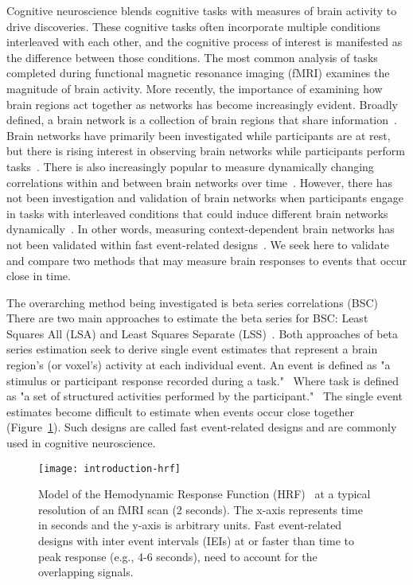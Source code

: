 \documentclass[phd,appendix,figures]{uithesis}
\begin{document}
Cognitive neuroscience blends cognitive tasks with measures of brain activity to drive discoveries.
These cognitive tasks often incorporate multiple conditions interleaved with each other,
and the cognitive process of interest is manifested as the difference between those conditions.
The most common analysis of tasks completed during functional magnetic resonance imaging (fMRI)
examines the magnitude of brain activity.
More recently, the importance of examining how brain regions act together as networks has become increasingly evident.
Broadly defined, a brain network is a collection of brain regions that share information~\cite{Uddin2019}.
Brain networks have primarily been investigated while participants are at rest, but there
is rising interest in observing brain networks while participants perform tasks~\cite{Cole2014a}.
There is also increasingly popular to measure dynamically changing correlations
within and between brain networks over time~\cite{Sakoglu2008,Hindriks2016}.
However, there has not been investigation and validation of brain networks
when participants engage in tasks with interleaved conditions that could induce
different brain networks dynamically~\cite{Di2019a}.
In other words, measuring context-dependent brain networks has not been validated within fast event-related designs~\cite{Buckner1998}.
We seek here to validate and compare two methods that may measure brain responses to events that occur
close in time.

The overarching method being investigated is beta series correlations (BSC)~\cite{Rissman2004,Mumford2012,Turner2012a,Abdulrahman2016}
There are two main approaches to estimate the beta series for BSC: Least Squares All (LSA) and Least Squares Separate (LSS)~\cite{Mumford2012}.
Both approaches of beta series estimation seek to derive single event estimates that represent a brain region's
(or voxel's) activity at each individual event.
An event is defined as "a stimulus or participant response recorded during a task."~\cite{Gorgolewski2016}
Where task is defined as "a set of structured activities performed by the participant."~\cite{Gorgolewski2016}
The single event estimates become difficult to estimate when events occur close together (Figure~\ref{fig:introhrf}).
Such designs are called fast event-related designs and are commonly
used in cognitive neuroscience.

\begin{figure}[H]
  \centering
  \texttt{[image: introduction-hrf]}
  \caption[Model of the Hemodynamic Response Function (HRF)]{
    Model of the Hemodynamic Response Function (HRF)~\cite{Glover1999} at a
    typical resolution of an fMRI scan (2 seconds). The x-axis represents time in seconds and the y-axis is arbitrary units.
    Fast event-related designs with inter event intervals (IEIs) at or faster than time to peak
    response (e.g., 4-6 seconds), need to account for the overlapping signals.
  }
  \label{fig:introhrf}
\end{figure}
\end{document}

